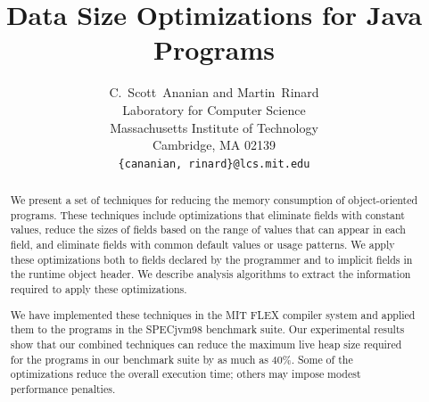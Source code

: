 \documentclass{acmconf}
\title{Data Size Optimizations for Java Programs}
\author{C.~Scott~Ananian and Martin~Rinard \\
Laboratory for Computer Science\\
Massachusetts Institute of Technology\\ 
Cambridge, MA 02139 \\
{\tt \{cananian, rinard\}@lcs.mit.edu}
}
\begin{document}

%
\maketitle
{}
%
\begin{abstract}
We present a set of techniques for reducing the memory consumption of
object-oriented programs. These techniques 
include optimizations that eliminate fields with
constant values, reduce the sizes of fields based on the range
of values that can appear in each field, and 
eliminate fields with common default values
or usage patterns.
We apply these optimizations both 
to fields declared by the programmer and to implicit fields in
the runtime object header. We describe analysis
algorithms to extract the information required to apply these
optimizations. 

We have implemented these techniques in the MIT FLEX compiler
system and applied them to the programs in the SPECjvm98 
benchmark suite. Our experimental results show that 
our combined techniques can reduce the maximum live heap size required
for the programs in our benchmark suite by as much as 40\%.
Some of the optimizations reduce the overall execution time;
others may impose modest performance penalties.
\end{abstract}
%
\end{document}
